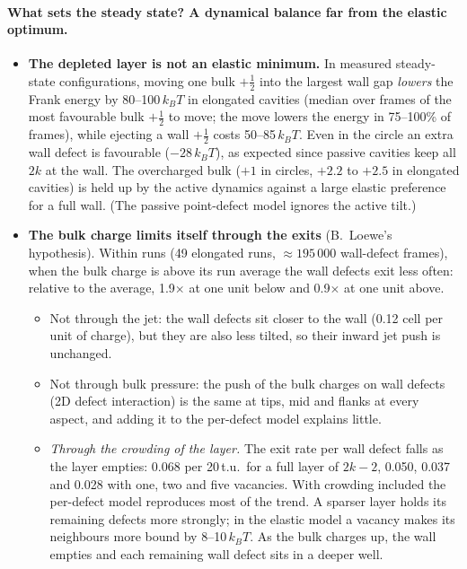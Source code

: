 \documentclass[aps,prl,onecolumn,superscriptaddress,amsmath,amssymb,nofootinbib]{revtex4-2}
\newcommand{\half}{\tfrac12}
\newcommand{\kT}{k_BT}
\begin{document}
\paragraph{What sets the steady state? A dynamical balance far from the elastic optimum.}
\begin{itemize}
  \item \textbf{The depleted layer is not an elastic minimum.} In measured steady-state configurations, moving one bulk $+\half$ into the largest wall gap \emph{lowers} the Frank
        energy by 80--100\,$\kT$ in elongated cavities (median over frames of the most favourable bulk $+\half$ to move; the move lowers the energy in 75--100\% of frames), while ejecting a wall $+\half$ costs 50--85\,$\kT$.
        Even in the circle an extra wall defect is favourable ($-28\,\kT$), as expected since passive cavities keep all $2k$ at the wall. The overcharged bulk ($+1$ in circles,
        $+2.2$ to $+2.5$ in elongated cavities) is held up by the active dynamics against a large elastic preference for a full wall. (The passive point-defect model ignores the active tilt.)
  \item \textbf{The bulk charge limits itself through the exits} (B.~Loewe's hypothesis). Within runs (49 elongated runs, $\approx195\,000$ wall-defect frames), when the bulk charge is
        above its run average the wall defects exit less often: relative to the average, 1.9$\times$ at one unit below and 0.9$\times$ at one unit above.
        \begin{itemize}
          \item Not through the jet: the wall defects sit closer to the wall (0.12 cell per unit of charge), but they are also less tilted, so their inward jet push is unchanged.
          \item Not through bulk pressure: the push of the bulk charges on wall defects (2D defect interaction) is the same at tips, mid and flanks at every aspect, and adding it to the
                per-defect model explains little.
          \item \emph{Through the crowding of the layer.} The exit rate per wall defect falls as the layer empties: 0.068 per 20\,t.u.\ for a full layer of $2k-2$, 0.050, 0.037 and 0.028 with one,
                two and five vacancies. With crowding included the per-defect model reproduces most of the trend. A sparser layer holds its remaining defects more strongly; in the
                elastic model a vacancy makes its neighbours more bound by 8--10\,$\kT$. As the bulk charges up, the wall empties and each remaining wall defect sits in a deeper well.

\end{itemize}
\end{itemize}
\end{document}
